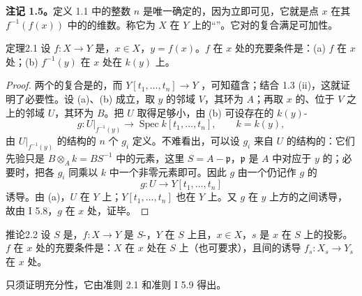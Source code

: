 \textbf{注记 1.5。}定义 1.1 中的整数 $n$ 是唯一确定的，因为立即可见，它就是点 $x$ 在其 $f^{-1}(f(x))$ 中的的维数。称它为 $X$ 在 $Y$ 上的“”。它对的复合满足可加性。

\begin{SGAresult}{定理}{2.1}
设 $f:X\to Y$ 是，$x\in X$，$y=f(x)$。$f$ 在 $x$ 处的充要条件是：\textup{(a)} $f$ 在 $x$ 处；\textup{(b)} $f^{-1}(y)$ 在 $x$ 处在 $k(y)$ 上。
\end{SGAresult}
\begin{proof}
两个的复合是的，而 $Y[t_1,\ldots,t_n]\to Y$ ，可知蕴含；结合 1.3 (ii)，这就证明了必要性。设 (a)、(b) 成立，取 $y$ 的邻域 $V$，其环为 $A$；再取 $x$ 的、位于 $V$ 之上的邻域 $U$，其环为 $B$。把 $U$ 取得足够小，由 (b) 可设存在的 $k(y)$-
\[
g:U|_{f^{-1}(y)}\longrightarrow\operatorname{Spec}k[t_1,\ldots,t_n],
\qquad k=k(y),
\]
由 $U|_{f^{-1}(y)}$ 的结构的 $n$ 个 $g_i$ 定义。不难看出，可以设 $g_i$ 来自 $U$ 的结构的：它们先验只是 $B\otimes_A k=BS^{-1}$ 中的元素，这里 $S=A-\mathfrak p$，$\mathfrak p$ 是 $A$ 中对应于 $y$ 的；必要时，把各 $g_i$ 同乘以 $k$ 中一个非零元素即可。因此 $g$ 由一个仍记作 $g$ 的
\[
g:U\longrightarrow Y[t_1,\ldots,t_n]
\]
诱导。由 (a)，$U$ 在 $Y$ 上；$Y[t_1,\ldots,t_n]$ 也在 $Y$ 上。又 $g$ 在 $y$ 上方的之间诱导，故由 I 5.8，$g$ 在 $x$ 处，证毕。
\end{proof}

\begin{SGAresult}{推论}{2.2}
设 $S$ 是，$f:X\to Y$ 是 $S$-，$Y$ 在 $S$ 上且，$x\in X$，$s$ 是 $x$ 在 $S$ 上的投影。$f$ 在 $x$ 处的充要条件是：$X$ 在 $x$ 处在 $S$ 上（也可要求），且间的诱导 $f_s:X_s\to Y_s$ 在 $x$ 处。
\end{SGAresult}
只须证明充分性，它由准则 2.1 和准则 I 5.9 得出。

